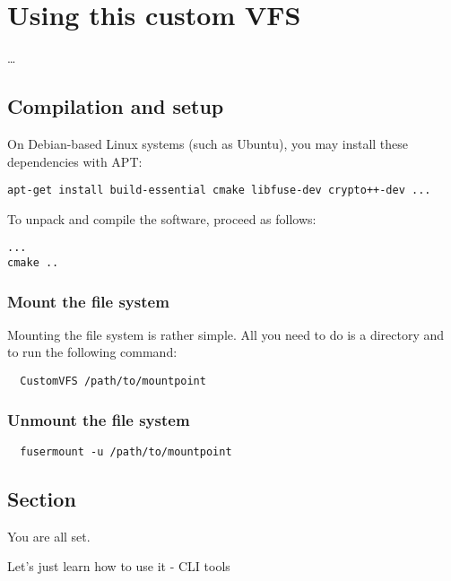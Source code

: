 \chapter{Using this custom VFS}

\ldots

\section*{Compilation and setup}

On Debian-based Linux systems (such as Ubuntu), you may install these dependencies with APT:


\begin{Verbatim}
apt-get install build-essential cmake libfuse-dev crypto++-dev ...
\end{Verbatim}

To unpack and compile the software, proceed as follows:

\begin{Verbatim}
...
cmake ..
\end{Verbatim}

\subsection*{Mount the file system}

Mounting the file system is rather simple.
All you need to do is a directory and to run the following command:

\begin{Verbatim}
  CustomVFS /path/to/mountpoint
\end{Verbatim}


\subsection*{Unmount the file system}

\begin{Verbatim}
  fusermount -u /path/to/mountpoint
\end{Verbatim}

\section*{Section}

You are all set.

Let's just learn how to use it - CLI tools